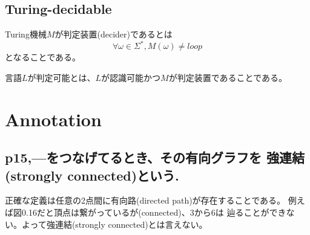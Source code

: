 \documentclass[b5paper,fleqn]{ltjsarticle}
\newcommand\s[1]{\subsection*{#1}\noindent\ignorespaces}
\begin{document}
\subsection{Turing-decidable}
Turing機械$M$が判定装置(decider)であるとは
\[\forall\omega\in\Sigma^*, M(\omega)\neq loop\]
となることである。\par
言語$L$が判定可能とは、$L$が認識可能かつ$M$が判定装置であることである。

\section{Annotation}

\s{p15,---をつなげてるとき、その有向グラフを
強連結(strongly connected)という.}
正確な定義は任意の2点間に有向路(directed path)が存在することである。
例えば図0.16だと頂点は繋がっているが(connected)、3から6は
辿ることができない。よって強連結(strongly connected)とは言えない。
\end{document}
